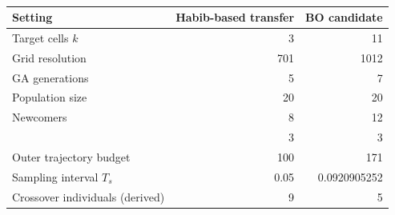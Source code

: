 \begin{table}[htbp]
\centering\small
\caption[Frozen configuration used for all validation and transfer runs]{}\label{tab:b-candidate}
\begingroup{}
\setlength{\tabcolsep}{4pt}
\begin{tabularx}{\linewidth}{@{}Y r r@{}}
\toprule
Setting & Habib-based transfer & BO candidate \\
\midrule
Target cells $k$ & 3 & 11 \\
Grid resolution & 701 & 1012 \\
GA generations & 5 & 7 \\
Population size & 20 & 20 \\
Newcomers & 8 & 12 \\
 & 3 & 3 \\
Outer trajectory budget & 100 & 171 \\
Sampling interval $T_s$ & 0.05 & 0.0920905252 \\
Crossover individuals (derived) & 9 & 5 \\
\bottomrule
\end{tabularx}\endgroup
\end{table}
